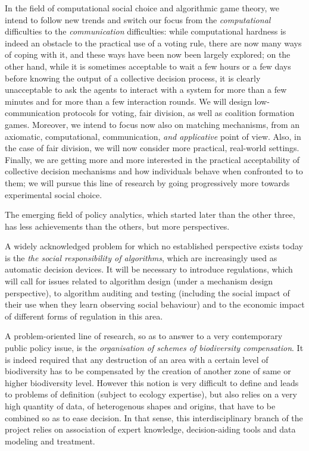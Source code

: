 In the field of computational social choice and algorithmic game theory, we intend to follow new trends and switch our focus from the {\em computational} difficulties to the {\em communication} difficulties: while computational hardness is indeed an obstacle to the practical use of a voting rule, there are now many ways of coping with it, and these ways have been now been largely explored; on the other hand, while it is sometimes acceptable to wait a few hours or a few days before knowing the output of a collective decision process, it is clearly unacceptable to ask the agents to interact with a system for more than a few minutes and for more than a few interaction rounds.  We will design low-communication protocols for voting, fair division, as well as coalition formation games. Moreover,   we intend to focus now also on matching mechanisms, from an axiomatic, computational, communication, {\em and applicative} point of view. 
Also, in the case of fair division, we will now consider more practical, real-world settings.
Finally, we are getting more and more interested in the practical acceptability of collective decision mechanisms and how individuals behave when confronted to to them; we will pursue this line of research by going progressively more towards experimental social choice.

The emerging field of policy analytics, which started later than the other three, has less achievements than the others, but more perspectives. 

A widely acknowledged problem for which no established perspective exists today is the {\em the social responsibility of algorithms}, which are increasingly used as automatic decision devices. It will be necessary to introduce regulations, which will call for issues related to algorithm design (under a mechanism design perspective), to algorithm auditing and testing (including the social impact of their use when they learn observing social behaviour) and to the economic impact of different forms of regulation in this area. 

A problem-oriented line of research, so as to answer to a very contemporary public policy issue, is the {\em organisation of schemes of biodiversity compensation}. It is indeed required that any destruction of an area with a certain level of biodiversity has to be compensated by the creation of another zone of same or higher biodiversity level. However this notion is very difficult to define and leads to problems of definition (subject to ecology expertise), but also relies on a very high quantity of data, of heterogenous shapes and origins, that have to be combined so as to ease decision. In that sense, this interdisciplinary branch of the project relies on association of expert knowledge, decision-aiding tools and data modeling and treatment. 

